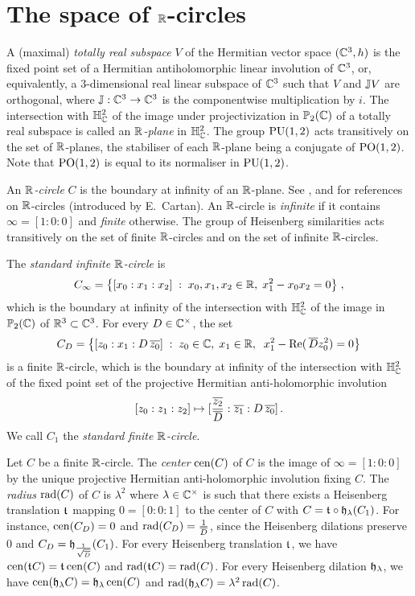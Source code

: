 \documentclass[11pt]{article}
\begin{document}
\section{The space of ${\mathbb R}$-circles}
\label{sec:R-circles}


A (maximal) {\em totally real subspace} $V$ of the Hermitian vector
space $({\mathbb C}^3,h)$ is the fixed point set of a Hermitian
antiholomorphic linear involution of ${\mathbb C}^3$, or, equivalently, a
$3$-dimensional real linear subspace of ${\mathbb C}^3$ such that $V$ and ${\mathbb J}
V$ are orthogonal, where ${\mathbb J}:{\mathbb C}^3\to{\mathbb C}^3$ is the componentwise
multiplication by $i$. The intersection with ${\mathbb H}^2_{\mathbb C}$ of the image
under projectivization in ${\mathbb P}_2({\mathbb C})$ of a totally real subspace is
called an ${\mathbb R}${\em -plane} in ${\mathbb H}^2_{\mathbb C}$. The group $\operatorname{PU}(1,2)$ acts
transitively on the set of ${\mathbb R}$-planes, the stabiliser of each
${\mathbb R}$-plane being a conjugate of $\operatorname{PO}(1,2)$.  Note that $\operatorname{PO}(1,2)$ is
equal to its normaliser in $\operatorname{PU}(1,2)$.


An {\it ${\mathbb R}$-circle} $C$ is the boundary at infinity of an
${\mathbb R}$-plane. See \cite{Mostow73}, \cite[\S 4.4]{Goldman99} and
\cite[\S 9]{Jacobowitz90} for references on ${\mathbb R}$-circles (introduced
by E.~Cartan).  An ${\mathbb R}$-circle is {\it infinite} if it contains
$\infty=[1:0:0]$ and {\it finite} otherwise. The group of Heisenberg
similarities acts transitively on the set of finite ${\mathbb R}$-circles and
on the set of infinite ${\mathbb R}$-circles.

The {\it standard infinite ${\mathbb R}$-circle} is
$$
C_\infty=\big\{[x_0:x_1:x_2]\;:\; x_0,x_1,x_2\in{\mathbb R},\;x_1^2-x_0x_2=0\big\}\;,
$$ 
which is the boundary at infinity of the intersection with
${\mathbb H}^2_{\mathbb C}$ of the image in ${\mathbb P}_2({\mathbb C})$ of ${\mathbb R}^3\subset {\mathbb C}^3$. For
every $D\in{\mathbb C}^\times$, the set
$$
C_{D}=\big\{[z_0:x_1:D\,{\overline{z_0}}]\;:\; z_0\in{\mathbb C},\;x_1\in{\mathbb R},\;
\;x_1^2-{\operatorname{Re}}(\,{\overline{D}}z_0^2)=0\big\}
$$ 
is a finite ${\mathbb R}$-circle, which is the boundary at infinity of the
intersection with ${\mathbb H}^2_{\mathbb C}$ of the fixed point set of the projective
Hermitian anti-holomorphic involution
$$
[z_0:z_1:z_2]\mapsto [\frac{{\overline{z_2}}}{{\overline{D}}}:{\overline{z_1}}:D\,{\overline{z_0}}]\,.
$$ 
We call $C_1$ the {\it standard finite ${\mathbb R}$-circle}.



Let $C$ be a finite ${\mathbb R}$-circle. The {\it center} $\operatorname{cen}(C)$ of $C$ is
the image of $\infty=[1:0:0]$ by the unique projective Hermitian
anti-holomorphic involution fixing $C$. The {\it radius} $\operatorname{rad}(C)$ of
$C$ is $\lambda^2$ where $\lambda\in{\mathbb C}^\times$ is such that there
exists a Heisenberg translation ${\mathfrak t}_{}$ mapping $0=[0:0:1]$ to the
center of $C$ with $C={\mathfrak t}_{}\circ {\mathfrak h}_{\lambda}(C_1)$.  For
instance, $\operatorname{cen}(C_D)=0$ and $\operatorname{rad}(C_D)= \frac{1}{{\overline{D}}}$, since the
Heisenberg dilations preserve $0$ and $C_D=
{\mathfrak h}_{\frac{1}{\sqrt{{\overline{D}}}}} (C_1)$.  For every Heisenberg
translation ${\mathfrak t}_{}$, we have $\operatorname{cen}({\mathfrak t}_{} C)={\mathfrak t}_{}\operatorname{cen}(C)$
and $\operatorname{rad}({\mathfrak t}_{} C)= \operatorname{rad}(C)$.  For every Heisenberg dilation
${\mathfrak h}_{\lambda}$, we have $\operatorname{cen}({\mathfrak h}_{\lambda} C)={\mathfrak h}_{\lambda}\operatorname{cen}(C)$ and
$\operatorname{rad}({\mathfrak h}_{\lambda} C)= \lambda^2\operatorname{rad}(C)$.
\end{document}
